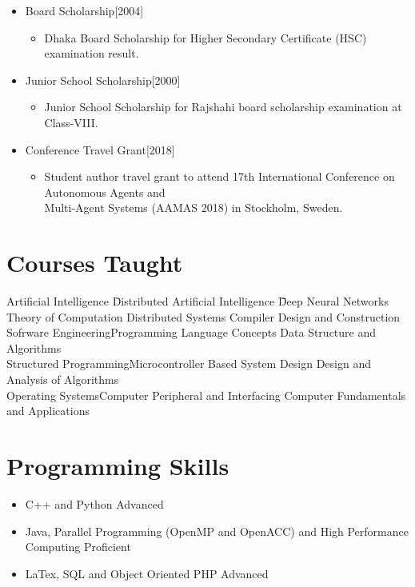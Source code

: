 \documentclass{article}
\begin{document}
\begin{itemize}
\item Board Scholarship\hfill [2004]
    \begin{itemize}
    \item Dhaka Board Scholarship for Higher Secondary Certificate (HSC) examination result.
    \end{itemize}    

\item Junior School Scholarship\hfill [2000]
    \begin{itemize}
    \item Junior School Scholarship for Rajshahi board scholarship examination at Class-VIII.
    \end{itemize}  
    
\item Conference Travel Grant\hfill [2018]
    \begin{itemize}
    \item Student author travel grant to attend 17th International Conference on Autonomous Agents and\\ Multi-Agent Systems (AAMAS 2018) in Stockholm, Sweden.
    \end{itemize}  

\end{itemize}
 

  


 \section{Courses Taught}
 \begin{tabbing}
    Artificial Intelligence\hspace{3.8em} \= Distributed Artificial Intelligence \hspace{3.8em} \= \=Deep Neural Networks \\
     Theory of Computation\> Distributed Systems  \>Compiler Design and Construction\\ Sofrware Engineering\>Programming Language Concepts\> Data Structure and Algorithms \\
     Structured Programming\>Microcontroller Based System Design\> Design and Analysis of Algorithms \\ 
     Operating Systems\>Computer Peripheral and Interfacing\> Computer Fundamentals and Applications

\end{tabbing}

 \section{Programming Skills}
 \begin{itemize}
    \item  C++ and Python  \hfill Advanced   
     \item  Java, Parallel Programming (OpenMP and OpenACC) and High Performance Computing \hfill Proficient 
     \item LaTex, SQL and Object Oriented PHP  \hfill Advanced  
  \end{itemize}
  
\end{document}

